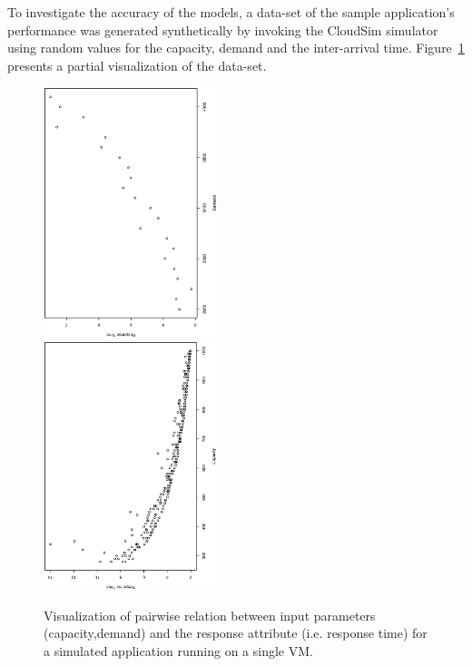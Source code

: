 To investigate the accuracy of the models, a data-set of the sample application's performance was generated synthetically by invoking the CloudSim simulator \cite{CLOUDSIM2010} using random values for the capacity, demand and the inter-arrival time. Figure~\ref{fig:arrival-rate-effect-on-response-time} presents a partial visualization of the data-set. 
\begin{figure}
	\centering
	\includegraphics[width=0.45\textwidth,angle=-90,origin=c]{image/centralized1/demand_response_time} \\
	\includegraphics[width=0.45\textwidth,angle=-90,origin=c]{image/centralized1/response_time_capacity}
	\caption[Visualization of pairwise relation between input parameters (capacity,demand) and the response attribute (i.e. response time) for a simulated application.]{Visualization of pairwise relation between input parameters (capacity,demand) and the response attribute (i.e. response time) for a simulated application running on a single VM.}
	\label{fig:arrival-rate-effect-on-response-time}
\end{figure}
